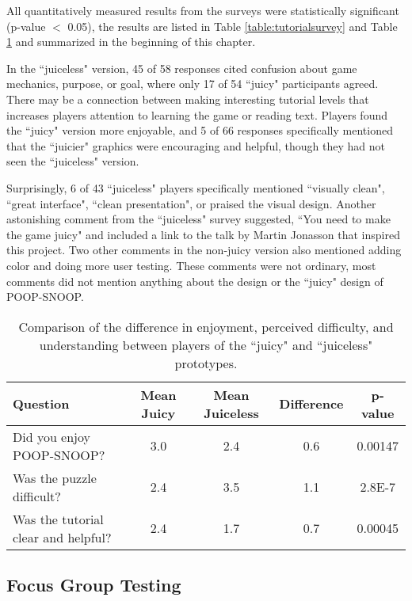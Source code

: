 All quantitatively measured results from the surveys were statistically significant (p-value $<$ 0.05), the results are listed in Table \ref{table:tutorialsurvey} and Table \ref{table:gamesurvey} and summarized in the beginning of this chapter.

In the ``juiceless" version, 45 of 58 responses cited confusion about game mechanics, purpose, or goal, where only 17 of 54 ``juicy" participants agreed. There may be a connection between making interesting tutorial levels that increases players attention to learning the game or reading text. Players found the ``juicy" version more enjoyable, and 5 of 66 responses specifically mentioned that the ``juicier" graphics were encouraging and helpful, though they had not seen the ``juiceless" version.

Surprisingly, 6 of 43 ``juiceless" players specifically mentioned ``visually clean", ``great interface", ``clean presentation", or praised the visual design. Another astonishing comment from the ``juiceless" survey suggested, ``You need to make the game juicy" and included a link to the talk by Martin Jonasson \cite{juiceitorloseit} that inspired this project. Two other comments in the non-juicy version also mentioned adding color and doing more user testing. These comments were not ordinary, most comments did not mention anything about the design or the ``juicy" design of POOP-SNOOP.

\begin{table}
\begin{center}

\begin{tabular}{|>{\centering}p{3cm}|c|c|c||c|}
\hline 
Question&  Mean Juicy&  Mean Juiceless&  Difference&  p-value
\tabularnewline
\hline 
Did you enjoy POOP-SNOOP?&  3.0&  2.4&  0.6&  0.00147
\tabularnewline
\hline 
Was the puzzle difficult?&  2.4&  3.5&  1.1&  2.8E-7
\tabularnewline
\hline 
Was the tutorial clear and helpful?&  2.4&  1.7&  0.7& 0.00045
\tabularnewline
\hline 
\end{tabular}

\caption[Post-game tutorial results]{Comparison of the difference in enjoyment, perceived difficulty, and understanding between players of the ``juicy" and ``juiceless" prototypes.}
\label{table:gamesurvey}
\end{center}
\end{table}

\subsection{Focus Group Testing}

